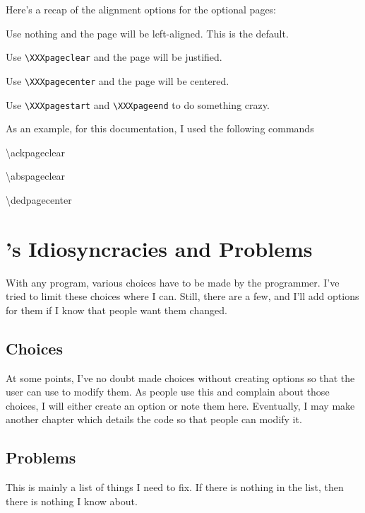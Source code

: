Here's a recap of the alignment options for the optional pages:

\begin{smallitem}
\item Use nothing and the page will be left-aligned. This is the default.
\item Use \texttt{\textbackslash{}XXXpageclear} and the page will be justified. 
\item Use \texttt{\textbackslash{}XXXpagecenter} and the page will be centered.
\item Use \texttt{\textbackslash{}XXXpagestart} and \texttt{\textbackslash{}XXXpageend}
to do something crazy.
\end{smallitem}
As an example, for this documentation, I used the following commands

\begin{lyxcode}
\textbackslash{}ackpageclear

\textbackslash{}abspageclear

\textbackslash{}dedpagecenter
\end{lyxcode}

\section{\beavtexnospace 's Idiosyncracies and Problems}

With any program, various choices have to be made by the programmer.
I've tried to limit these choices where I can. Still, there are a
few, and I'll add options for them if I know that people want them
changed.


\subsection{Choices}

At some points, I've no doubt made choices without creating options
so that the user can use to modify them. As people use this and complain
about those choices, I will either create an option or note them here.
Eventually, I may make another chapter which details the code so that
people can modify it. 


\subsection{Problems}

This is mainly a list of things I need to fix. If there is nothing
in the list, then there is nothing I know about.

\begin{comment}



\end{comment}

